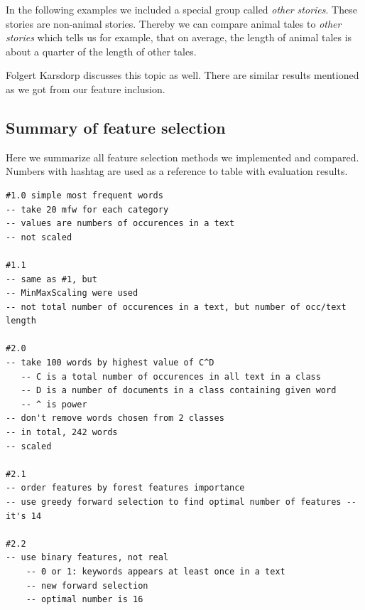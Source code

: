 \documentclass[a4paper]{article}
\begin{document}
In the following examples we included a special group called \textit{other stories}. These stories are non-animal stories. Thereby we can compare animal tales to \textit{other stories} which tells us for example, that on average, the length of animal tales is about a quarter of the length of other tales. %

Folgert Karsdorp \cite{RETELLING} discusses this topic as well. There are similar results mentioned as we got from our feature inclusion. 



%
%


\subsection{Summary of feature selection}

Here we summarize all feature selection methods we implemented and
compared. Numbers with hashtag are used as a reference to table with
evaluation results.

\begin{verbatim}
#1.0 simple most frequent words
-- take 20 mfw for each category
-- values are numbers of occurences in a text
-- not scaled

#1.1
-- same as #1, but 
-- MinMaxScaling were used
-- not total number of occurences in a text, but number of occ/text
length
		    
#2.0
-- take 100 words by highest value of C^D
   -- C is a total number of occurences in all text in a class
   -- D is a number of documents in a class containing given word
   -- ^ is power
-- don't remove words chosen from 2 classes
-- in total, 242 words
-- scaled

#2.1
-- order features by forest features importance
-- use greedy forward selection to find optimal number of features -- it's 14
		    
#2.2
-- use binary features, not real
    -- 0 or 1: keywords appears at least once in a text
    -- new forward selection
    -- optimal number is 16
\end{verbatim}
\end{document}
